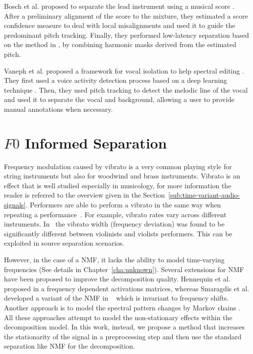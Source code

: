 \par
Bosch et al. proposed to separate the lead instrument using a musical score \cite{bosch12}. After a preliminary alignment of the score to the mixture, they estimated a score confidence measure to deal with local misalignments and used it to guide the predominant pitch tracking. Finally, they performed low-latency separation based on the method in \cite{marxer12}, by combining harmonic masks derived from the estimated pitch.
\par
Vaneph et al. proposed a framework for vocal isolation to help spectral editing \cite{vaneph16}. They first used a voice activity detection process based on a deep learning technique \cite{Leglaive15}. Then, they used pitch tracking to detect the melodic line of the vocal and used it to separate the vocal and background, allowing a user to provide manual annotations when necessary.

\section{$F0$ Informed Separation}
\label{sub:frequency_modulation}


Frequency modulation caused by vibrato is a very common playing style for string instruments but also for woodwind and brass instruments.
Vibrato is an effect that is well studied especially in musicology, for more information the reader is referred to the overview given in the Section~\ref{sub:time-variant-audio-signals}.
Performers are able to perform a vibrato in the same way when repeating a performance~\cite{fletcher01}.
For example, vibrato rates vary across different instruments.
In~\cite{macleod06} the vibrato width (frequency deviation) was found to be significantly different between violinists and violists performers.
This can be exploited in source separation scenarios.
\par
However, in the case of a NMF, it lacks the ability to model time-varying frequencies (See details in Chapter~\ref{cha:unknown}).
Several extensions for NMF have been proposed to improve the decomposition quality.
Hennequin et al. proposed in \cite{hennequin11} a frequency dependent activations matrices, whereas Smaragdis et al. developed a variant of the NMF in ~\cite{smaragdis08} which is invariant to frequency shifts.
Another approach is to model the spectral pattern changes by Markov chains \cite{nakano10}. All these approaches attempt to model the non-stationary effects within the decomposition model.
In this work, instead, we propose a method that increases the stationarity of the signal in a preprocessing step and then use the standard separation like NMF for the decomposition.\\

